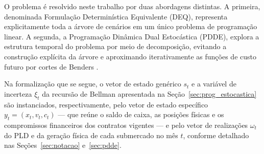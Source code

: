 O problema \'e resolvido neste trabalho por duas abordagens distintas. A primeira, denominada Formula\c{c}\~ao Determin\'istica Equivalente (DEQ), representa explicitamente toda a \'arvore de cen\'arios em um \'unico problema de programa\c{c}\~ao linear. A segunda, a Programa\c{c}\~ao Din\^amica Dual Estoc\'astica (PDDE), explora a estrutura temporal do problema por meio de decomposi\c{c}\~ao, evitando a constru\c{c}\~ao expl\'icita da \'arvore e aproximando iterativamente as fun\c{c}\~oes de custo futuro por cortes de Benders \cite{pereira1991}.

Na formaliza\c{c}\~ao que se segue, o vetor de estado gen\'erico $s_t$ e a vari\'avel de incerteza $\xi_t$ da recurs\~ao de Bellman apresentada na Se\c{c}\~ao~\ref{sec:prog_estocastica} s\~ao instanciados, respectivamente, pelo vetor de estado espec\'ifico $y_t = (x_t, v_t, c_t)$ --- que re\'une o saldo de caixa, as posi\c{c}\~oes f\'isicas e os compromissos financeiros dos contratos vigentes --- e pelo vetor de realiza\c{c}\~oes $\omega_t$ do PLD e da gera\c{c}\~ao f\'isica de cada submercado no m\^es $t$, conforme detalhado nas Se\c{c}\~oes~\ref{sec:notacao} e~\ref{sec:pdde}.
